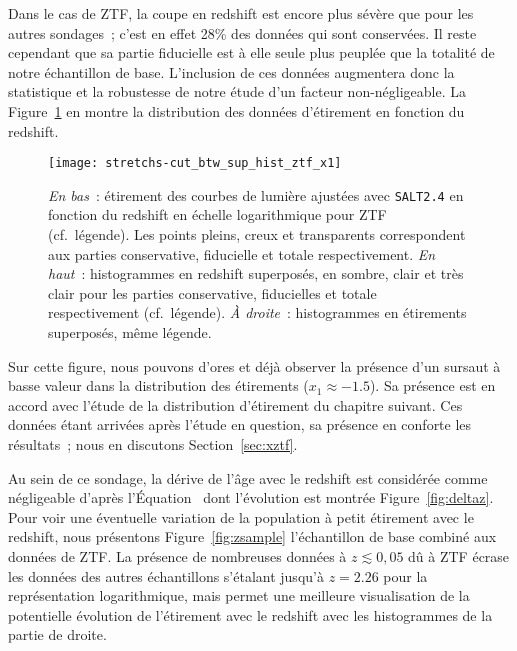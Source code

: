 \documentclass[../main/main.tex]{subfiles}
\begin{document}
Dans le cas de ZTF, la coupe en redshift est encore plus sévère que pour les
autres sondages~; c'est en effet 28\% des données qui sont conservées. Il reste
cependant que sa partie fiducielle est à elle seule plus peuplée que la totalité
de notre échantillon de base. L'inclusion de ces données augmentera donc la
statistique et la robustesse de notre étude d'un facteur non-négligeable. La
Figure~\ref{fig:ztfsample} en montre la distribution des données d'étirement en
fonction du redshift.

\begin{figure}[ht!]
    \centering
    \texttt{[image: stretchs-cut\_btw\_sup\_hist\_ztf\_x1]}
    \caption[Présentation des données d'étirement en fonction du redshift pour
    ZTF]{\textit{En bas}~: étirement des courbes de lumière ajustées avec
        \textsc{\texttt{SALT2.4}} en fonction du redshift en échelle
        logarithmique pour ZTF (cf.~légende). Les points pleins, creux et
        transparents correspondent aux parties conservative, fiducielle et
        totale respectivement. \textit{En haut}~: histogrammes en redshift
        superposés, en sombre, clair et très clair pour les parties
        conservative, fiducielles et totale respectivement (cf.\ légende).
        \textit{À droite}~: histogrammes en étirements superposés, même
    légende.}\label{fig:ztfsample}
\end{figure}

Sur cette figure, nous pouvons d'ores et déjà observer la présence d'un sursaut
à basse valeur dans la distribution des étirements ($x_1 \approx -1.5$). Sa
présence est en accord avec l'étude de la distribution d'étirement du chapitre
suivant. Ces données étant arrivées après l'étude en question, sa présence en
conforte les résultats~; nous en discutons Section~\ref{sec:xztf}.

Au sein de ce sondage, la dérive de l'âge avec le redshift est considérée comme
négligeable d'après l'Équation~ dont l'évolution est montrée
Figure~\ref{fig:deltaz}. Pour voir une éventuelle variation de la population à
petit étirement avec le redshift, nous présentons Figure~\ref{fig:zsample}
l'échantillon de base combiné aux données de ZTF. La présence de nombreuses
données à $z \lesssim 0,05$ dû à ZTF écrase les données des autres échantillons
s'étalant jusqu'à $z = 2.26$ pour la représentation logarithmique, mais permet
une meilleure visualisation de la potentielle évolution de l'étirement avec le
redshift avec les histogrammes de la partie de droite.
\end{document}
